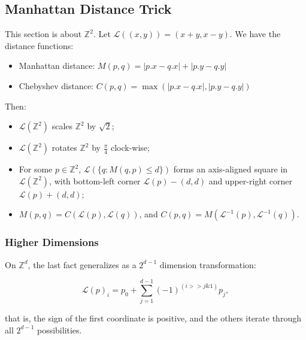 \subsection{Manhattan Distance Trick}

This section is about $\mathbb Z^2$. Let $\mathcal L((x, y)) = (x+y, x-y)$. We have the distance functions:

\begin{itemize}
    \item Manhattan distance: $M(p, q) = |p.x - q.x| + |p.y - q.y|$
    \item Chebyshev distance: $C(p, q) = \max(|p.x - q.x|, |p.y - q.y|)$
\end{itemize}

Then:

\begin{itemize}
    \item $\mathcal L(\mathbb Z^2)$ scales $\mathbb Z^2$ by $\sqrt 2$;
    \item $\mathcal L(\mathbb Z^2)$ rotates $\mathbb Z^2$ by $\frac \pi 4$ clock-wise;
    \item For some $p \in \mathbb Z^2$, $\mathcal L(\{q : M(q, p) \leq d\})$ forms an axis-aligned square in $\mathcal L(\mathbb Z^2)$, with bottom-left corner $\mathcal L(p) - (d, d)$ and upper-right corner $\mathcal L(p) + (d, d)$;
    \item $M(p, q) = C(\mathcal L(p), \mathcal L(q))$, and $C(p, q) = M(\mathcal L^{-1}(p), \mathcal L^{-1}(q))$.
\end{itemize}

\subsubsection{Higher Dimensions}

On $\mathbb Z^d$, the last fact generalizes as a $2^{d-1}$ dimension transformation:

$$ \mathcal L(p)_{i} = p_0 + \sum_{j=1}^{d-1} (-1)^{(i>>j\&1)} p_j, $$

that is, the sign of the first coordinate is positive, and the others iterate through all $2^{d-1}$ possibilities.
